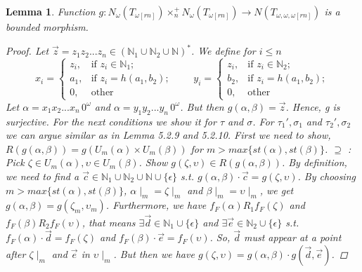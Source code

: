 \documentclass[12pt, a4paper]{scrartcl}
\newtheorem{lemma}[definition]{Lemma}
\begin{document}
    \begin{lemma}
        Function $g : N_\omega(T_{\omega[rn]}) \times^+_n N_\omega(T_{\omega[rn]}) \rightarrow N(T_{\omega,\omega,\omega[rn]})$ is a bounded morphism.
        
        \begin{proof}
            Let $\vec{z} = z_1z_2...z_n \in (\mathbb{N}_{1} \cup \mathbb{N}_{2} \cup \mathbb{N})^*$. We define for $i \leq n $
        \[
            x_i = 
            \begin{cases}
            z_i, & \text{if } z_i \in \mathbb{N}_{1}; \\
            a_1, & \text{if } z_i = h(a_1,b_2); \\
            0,   & \text{other}
            \end{cases}
            \qquad
            y_i = 
            \begin{cases}
            z_i, & \text{if } z_i \in \mathbb{N}_{2}; \\
            b_2, & \text{if } z_i = h(a_1,b_2); \\
            0,   & \text{other } 
            \end{cases}
        \] 
        \newline
        Let $\alpha = x_1x_2...x_n \, 0^\omega$ and $\alpha = y_1y_2...y_n \, 0^\omega$. But then $g(\alpha,\beta) = \vec{z}$. Hence, g is surjective.
        For the next conditions we show it for $\tau$ and $\sigma$. For $\tau_1', \sigma_1$ and $\tau_2', \sigma_2$ we can argue similar as in Lemma 5.2.9 and 5.2.10.\newline
        First we need to show, $R(g(\alpha,\beta)) = g(U_m(\alpha) \times U_m(\beta))$ for $m > max\{st(\alpha), st(\beta)\}$.
         \newline
        $\supseteq$ : Pick $\zeta \in U_m(\alpha), \upsilon \in U_m(\beta)$. Show $g(\zeta, \upsilon) \in R(g(\alpha,\beta))$. By definition, we need to find a $\vec{c} \in \mathbb{N}_1 \cup \mathbb{N}_2 \cup \mathbb{N} \cup \{\epsilon\}$ s.t. $g(\alpha,\beta) \cdot \vec{c} = g(\zeta, \upsilon)$.
        By choosing $m> max\{st(\alpha),st(\beta)\}$, $\alpha \mid_m = \zeta \mid_m$ and $\beta \mid_m = \upsilon \mid_m$, we get $g(\alpha,\beta) = g(\zeta_m, \upsilon_m)$. Furthermore, we have $f_F(\alpha)R_1f_F(\zeta)$ and $f_F(\beta)R_2f_F(\upsilon)$, that means $\exists \vec{d} \in \mathbb{N}_1 \cup \{\epsilon\}$ and $\exists \vec{e} \in \mathbb{N}_2 \cup \{\epsilon\}$ s.t.
        $f_F(\alpha) \cdot \vec{d} = f_F(\zeta)$ and $f_F(\beta) \cdot \vec{e} = f_F(\upsilon)$. So, $\vec{d}$ must appear at a point after $\zeta \mid_m$ and $\vec{e}$ in $\upsilon \mid_m$. But then we have $g(\zeta, \upsilon) = g(\alpha,\beta) \cdot g(\vec{d}, \vec{e})$.  

\end{proof}
\end{lemma}
\end{document}
